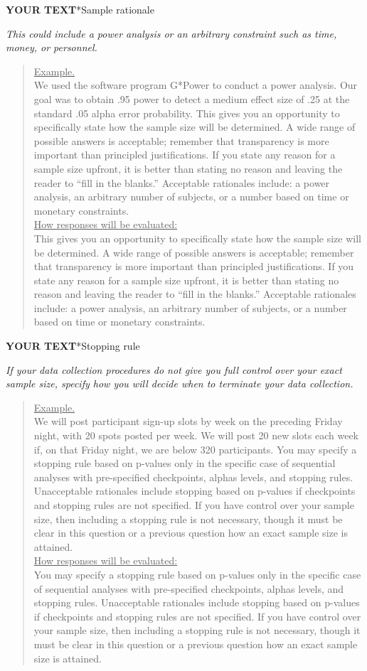 \documentclass{article}
\newcommand{\example}[2]{\vspace{-0.3cm}\begin{quote}\underline{Example.}\\#1\ifx#2\undefined \else \\[0.2cm]\underline{How responses will be evaluated:}\\#2\fi\\\end{quote}}
\newcommand{\yourtext}[1]{\noindent\textbf{\color{red}YOUR TEXT}}
\begin{document}
	\yourtext
	
	\subsection*{Sample rationale}
	
	\ifx\hidehints\undefined
	
	\textit{%
		This could include a power analysis or an arbitrary constraint such as time, money, or personnel.
	}\\
	
	\example{
		We used the software program G*Power to conduct a power analysis. Our goal was to obtain .95 power to detect a medium effect size of .25 at the standard .05 alpha error probability.}{		
		This gives you an opportunity to specifically state how the sample size will be determined. A wide range of possible answers is acceptable; remember that transparency is more important than principled justifications. If you state any reason for a sample size upfront, it is better than stating no reason and leaving the reader to “fill in the blanks.” Acceptable rationales include: a power analysis, an arbitrary number of subjects, or a number based on time or monetary constraints.
	}
	\fi
	
	\yourtext
	
	\subsection*{Stopping rule}
	
	\ifx\hidehints\undefined
	
	\textit{%
		If your data collection procedures do not give you full control over your exact sample size, specify how you will decide when to terminate your data collection. 
	}\\
	
	\example{
		We will post participant sign-up slots by week on the preceding Friday night, with 20 spots posted per week. We will post 20 new slots each week if, on that Friday night, we are below 320 participants.}{		
		You may specify a stopping rule based on p-values only in the specific case of sequential analyses with pre-specified checkpoints, alphas levels, and stopping rules. Unacceptable rationales include stopping based on p-values if checkpoints and stopping rules are not specified. If you have control over your sample size, then including a stopping rule is not necessary, though it must be clear in this question or a previous question how an exact sample size is attained.
	}
	\fi
	
\end{document}

